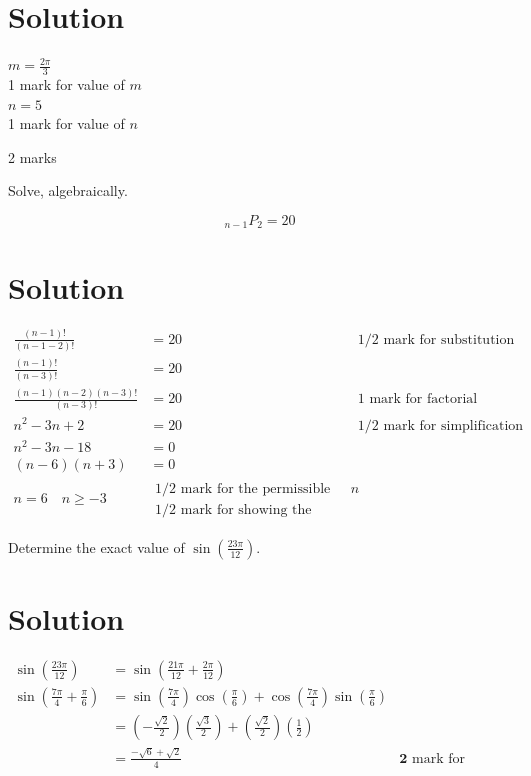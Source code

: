 \documentclass[10pt]{article}
\begin{document}
\section*{Solution}
$m=\frac{2 \pi}{3}$\\
1 mark for value of $m$\\
$n=5$\\
1 mark for value of $n$

2 marks

Solve, algebraically.

$$
{ }_{n-1} P_{2}=20
$$

\section*{Solution}
$$
\begin{array}{rlrl}
\frac{(n-1)!}{(n-1-2)!} & =20 & & 1 / 2 \text { mark for substitution } \\
\frac{(n-1)!}{(n-3)!} & =20 & \\
\frac{(n-1)(n-2)(n-3)!}{(n-3)!} & =20 & & 1 \text { mark for factorial expansion } \\
n^{2}-3 n+2 & =20 & & 1 / 2 \text { mark for simplification of factorials } \\
n^{2}-3 n-18 & =0 & \\
(n-6)(n+3) & =0 & \\
n=6 \quad n \geq-3 & \begin{array}{l}
1 / 2 \text { mark for the permissible value of } n \\
1 / 2 \text { mark for showing the rejection of the extraneous root }
\end{array}
\end{array}
$$

Determine the exact value of $\sin \left(\frac{23 \pi}{12}\right)$.

\section*{Solution}
$$
\begin{array}{rlr}
\sin \left(\frac{23 \pi}{12}\right) & =\sin \left(\frac{21 \pi}{12}+\frac{2 \pi}{12}\right) \\
\sin \left(\frac{7 \pi}{4}+\frac{\pi}{6}\right) & =\sin \left(\frac{7 \pi}{4}\right) \cos \left(\frac{\pi}{6}\right)+\cos \left(\frac{7 \pi}{4}\right) \sin \left(\frac{\pi}{6}\right) & \\
& =\left(-\frac{\sqrt{2}}{2}\right)\left(\frac{\sqrt{3}}{2}\right)+\left(\frac{\sqrt{2}}{2}\right)\left(\frac{1}{2}\right) & \\
& =\frac{-\sqrt{6}+\sqrt{2}}{4} & \mathbf{2} \text { mark for substitution into correct identity }
\end{array}
$$
\end{document}
